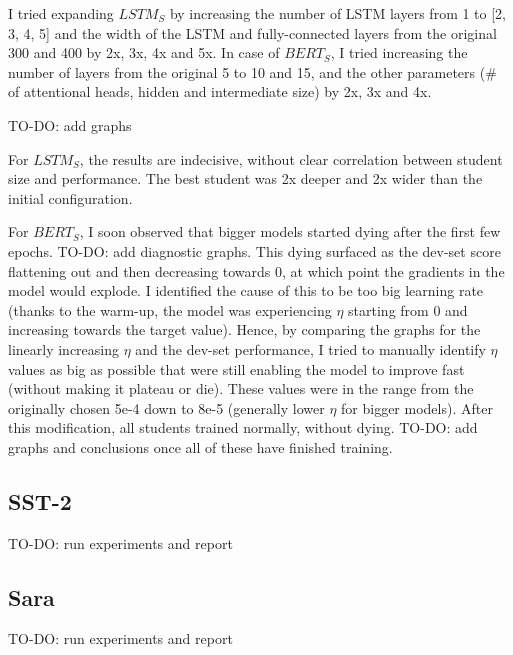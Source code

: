 \documentclass[bsc,frontabs,twoside,singlespacing,parskip,deptreport]{infthesis}
\begin{document}
{{{      I tried expanding $LSTM_S$ by increasing the number of LSTM layers from 1 to [2, 3, 4, 5] and the width of the LSTM and fully-connected layers from the original 300 and 400 by 2x, 3x, 4x and 5x.
      In case of $BERT_S$, I tried increasing the number of layers from the original 5 to 10 and 15, and the other parameters (\# of attentional heads, hidden and intermediate size) by 2x, 3x and 4x.
      
      TO-DO: add graphs

      For $LSTM_S$, the results are indecisive, without clear correlation between student size and performance. The best student was 2x deeper and 2x wider than the initial configuration.

      For $BERT_S$, I soon observed that bigger models started dying after the first few epochs. TO-DO: add diagnostic graphs. This dying surfaced as the dev-set score flattening out and then decreasing towards 0, at which point the gradients in the model would explode. I identified the cause of this to be too big learning rate (thanks to the warm-up, the model was experiencing $\eta$ starting from 0 and increasing towards the target value). Hence, by comparing the graphs for the linearly increasing $\eta$ and the dev-set performance, I tried to manually identify $\eta$ values as big as possible that were still enabling the model to improve fast (without making it plateau or die). These values were in the range from the originally chosen 5e-4 down to 8e-5 (generally lower $\eta$ for bigger models). After this modification, all students trained normally, without dying. TO-DO: add graphs and conclusions once all of these have finished training.
    }
    \subsection{SST-2}{
      TO-DO: run experiments and report
    }
    \subsection{Sara}{
      TO-DO: run experiments and report
    }
  }
}
\end{document}

